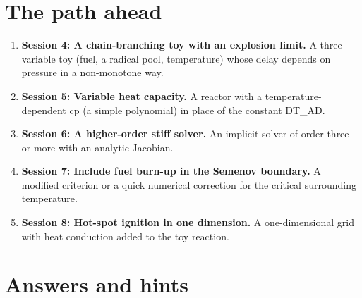 \documentclass[11pt,a4paper]{article}
\begin{document}
\section{The path ahead}
\begin{enumerate}[nosep]
\item \textbf{Session 4: A chain-branching toy with an explosion limit.} A three-variable toy (fuel, a radical pool, temperature) whose delay depends on pressure in a non-monotone way.
\item \textbf{Session 5: Variable heat capacity.} A reactor with a temperature-dependent cp (a simple polynomial) in place of the constant DT\_AD.
\item \textbf{Session 6: A higher-order stiff solver.} An implicit solver of order three or more with an analytic Jacobian.
\item \textbf{Session 7: Include fuel burn-up in the Semenov boundary.} A modified criterion or a quick numerical correction for the critical surrounding temperature.
\item \textbf{Session 8: Hot-spot ignition in one dimension.} A one-dimensional grid with heat conduction added to the toy reaction.
\end{enumerate}

\section{Answers and hints}
\end{document}

